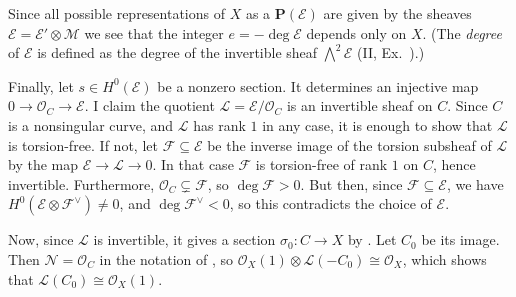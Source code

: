 {Since all possible representations of $X$ as a $\mathbf P(\mathcal E)$ are given by the sheaves $\mathcal E=\mathcal E'\otimes\mathcal M$  we see that the integer $e=-\deg\mathcal E$ depends only on $X$. (The \emph{degree} of $\mathcal E$ is defined as the degree of the invertible sheaf $\bigwedge^2\mathcal E$ (II, Ex.~).)

Finally, let $s\in H^0(\mathcal E)$ be a nonzero section. It determines an injective map $0\to\mathcal O_C\to\mathcal E$. I claim the quotient $\mathcal L=\mathcal E/\mathcal O_C$ is an invertible sheaf on $C$. Since $C$ is a nonsingular curve, and $\mathcal L$ has rank $1$ in any case, it is enough to show that $\mathcal L$ is torsion-free. If not, let $\mathcal F\subseteq\mathcal E$ be the inverse image of the torsion subsheaf of $\mathcal L$ by the map $\mathcal E\to\mathcal L\to0$. In that case $\mathcal F$ is torsion-free of rank $1$ on $C$, hence invertible. Furthermore, $\mathcal O_C\subsetneq\mathcal F$, so $\deg\mathcal F>0$. But then, since $\mathcal F\subseteq\mathcal E$, we have $H^0(\mathcal E\otimes\mathcal F^\vee)\ne0$, and $\deg\mathcal F^\vee<0$, so this contradicts the choice of $\mathcal E$.

Now, since $\mathcal L$ is invertible, it gives a section $\sigma_0\colon C\to X$ by . Let $C_0$ be its image. Then $\mathcal N=\mathcal O_C$ in the notation of , so $\mathcal O_X(1)\otimes\mathcal L(-C_0)\cong\mathcal O_X$, which shows that $\mathcal L(C_0)\cong\mathcal O_X(1)$.
}
